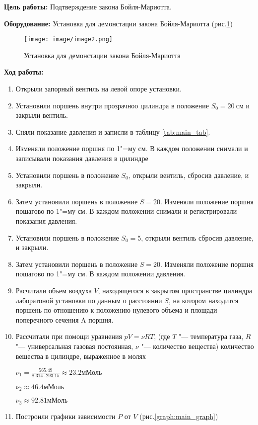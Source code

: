 \textbf{Цель работы:} Подтверждение закона Бойля-Мариотта.

\textbf{Оборудование:} Установка для демонстации закона Бойля-Мариотта (рис.\ref{fig:установка для демнострации закона Бойля-Мариотта})

\begin{figure}[!h]
    \centering
    \texttt{[image: image/image2.png]}
    
    \caption{Установка для демонстации закона Бойля-Мариотта}
    
    \label{fig:установка для демнострации закона Бойля-Мариотта}
\end{figure}

\textbf{Ход работы:}

\begin{enumerate}
    \item{Открыли запорный вентиль на левой опоре установки.}
    \item{Установили поршень внутри прозрачноо цилиндра в положение $S_0 = 20 ~ \text{см}$ и закрыли вентиль.}
    \item{Сняли показание давления и записли в таблицу \ref{tab:main_tab}.}
    \item{Изменяли положение поршня по 1"=му см. В каждом положении снимали и записывали показания давления в цилиндре}
    \item{Установили поршень в положение $S_0$, открыли вентиль, сбросив давление, и закрыли.}
    \item{Затем установили поршень в положение $S = 20$. Изменяли положение поршня пошагово по 1"=му см. В каждом положении снимали и регистрировали показания давления.}
    \item{Установили поршень в положение $S_0 = 5$, открыли вентиль сбросив давление, и закрыли.}
    \item{Затем установили поршень в положение $S = 20$. Изменяли положение поршня пошагово по 1"=му см. В каждом положении давления.}
    \item{Расчитали объем воздуха $V$, находящегося в закрытом пространстве цилиндра лаборатоной установки по данным о расстоянии $S$, на котором находится поршень по отношению к положению нулевого объема и площади поперечного сечения A поршня.}
    \item{Рассчитали при помощи уравнения $p V = \nu R T$, (где $T$ "--- температура газа, $R$ "--- универсальная газовая постоянная, $\nu$ "--- количество вещества) количество вещества в цилиндре, выраженное в молях}
    
    $
        \nu_1 = \frac{565.49}{8.314 \cdot 293.15} \approx 23.2 \text{мМоль}
    $
    
    $
        \nu_2 \approx 46.4 \text{мМоль}
    $
    
    $
        \nu_3 \approx 92.81 \text{мМоль}
    $
    \item{Построили графики зависимости $P$ от $V$ (рис.\ref{graph:main_graph})}
\end{enumerate}

